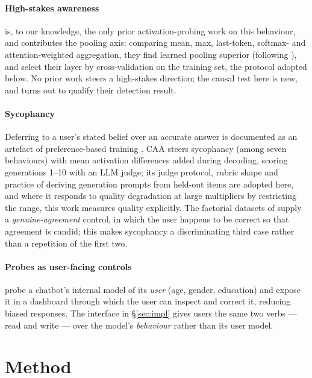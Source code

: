 \documentclass[conference]{IEEEtran}
\begin{document}
\paragraph{High-stakes awareness}
\citet{mckenzie2025} is, to our knowledge, the only prior activation-probing
work on this behaviour, and contributes the pooling axis: comparing mean, max,
last-token, softmax- and attention-weighted aggregation, they find learned
pooling superior (following \citealt{kantamneni2025}), and select their layer by
cross-validation on the training set, the protocol adopted below. No prior work
steers a high-stakes direction; the causal test here is new, and turns out to
qualify their detection result.

\paragraph{Sycophancy}
Deferring to a user's stated belief over an accurate answer is documented as an
artefact of preference-based training \citep{perez2023,sharma2023}. CAA
\citep{rimsky2024} steers sycophancy (among seven behaviours) with mean
activation differences added during decoding, scoring generations 1--10 with an
LLM judge; its judge protocol, rubric shape and practice of deriving generation
prompts from held-out items are adopted here, and where it responds to
quality degradation at large multipliers by restricting the range, this work
measures quality explicitly. The factorial
datasets of \citet{cincynlp2025} supply a \emph{genuine-agreement} control, in
which the user happens to be correct so that agreement is candid; this makes
sycophancy a discriminating third case rather than a repetition of the first two.

\paragraph{Probes as user-facing controls}
\citet{chen2024} probe a chatbot's internal model of its \emph{user} (age,
gender, education) and expose it in a dashboard through which the user can
inspect and correct it, reducing biased responses. The interface in
§\ref{sec:impl} gives users the same two verbs --- read and write --- over the
model's \emph{behaviour} rather than its user model.


\section{Method}
\label{sec:method}
\end{document}
